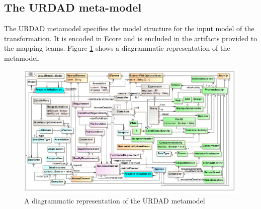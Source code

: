 \subsection{The URDAD meta-model}

The URDAD metamodel specifies the model structure for the input model of the transformation. It is encoded in Ecore and is encluded in the artifacts provided to the mapping teams. Figure \ref{fig:metamodel} shows a diagrammatic representation of the metamodel. 

\begin{figure}
  \centering
  \includegraphics{metamodel}
  \caption{A diagrammatic representation of the URDAD metamodel}
  \label{fig:metamodel}
\end{figure}



